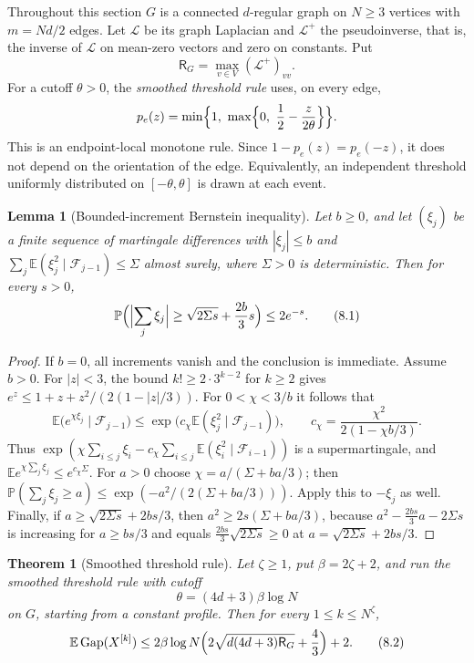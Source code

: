 \documentclass[11pt]{article}
\newtheorem{theorem}{Theorem}[section]
\newtheorem{lemma}[lemma]{Lemma}
\theoremstyle{remark}
\newcommand{\E}{\mathbb{E}}
\newcommand{\Pp}{\mathbb{P}}
\newcommand{\Gap}{\operatorname{Gap}}
\begin{document}
Throughout this section $G$ is a connected $d$-regular graph on $N\ge3$ vertices with $m=Nd/2$ edges. Let $\mathcal L$ be its graph Laplacian and $\mathcal L^+$ the pseudoinverse, that is, the inverse of $\mathcal L$ on mean-zero vectors and zero on constants. Put
\[
 \mathsf R_G=\max_{v\in V}(\mathcal L^+)_{vv}.
\]
For a cutoff $\theta>0$, the \emph{smoothed threshold rule} uses, on every edge,
\[
 p_e(z)=\min\Bigl\{1,\ \max\Bigl\{0,\ \frac12-\frac z{2\theta}\Bigr\}\Bigr\}.
\]
This is an endpoint-local monotone rule. Since $1-p_e(z)=p_e(-z)$, it does not depend on the orientation of the edge. Equivalently, an independent threshold uniformly distributed on $[-\theta,\theta]$ is drawn at each event.

\begin{lemma}[Bounded-increment Bernstein inequality]\label{lem:bernstein}
Let $b\ge0$, and let $(\xi_j)$ be a finite sequence of martingale differences with $|\xi_j|\le b$ and $\sum_j\E(\xi_j^2\mid\mathcal F_{j-1})\le\Sigma$ almost surely, where $\Sigma>0$ is deterministic. Then for every $s>0$,
\[
 \Pp\Bigl(\Bigl|\sum_j\xi_j\Bigr|\ge\sqrt{2\Sigma s}+\frac{2b}3s\Bigr)\le2e^{-s}.
 \tag{8.1}\label{eq:bernstein}
\]
\end{lemma}

\begin{proof}
If $b=0$, all increments vanish and the conclusion is immediate. Assume $b>0$. For $|z|<3$, the bound $k!\ge2\cdot3^{k-2}$ for $k\ge2$ gives $e^z\le1+z+z^2/(2(1-|z|/3))$. For $0<\chi<3/b$ it follows that
\[
 \E\bigl(e^{\chi\xi_j}\mid\mathcal F_{j-1}\bigr)
 \le\exp\bigl(c_\chi\E(\xi_j^2\mid\mathcal F_{j-1})\bigr),
 \qquad c_\chi=\frac{\chi^2}{2(1-\chi b/3)}.
\]
Thus $\exp(\chi\sum_{i\le j}\xi_i-c_\chi\sum_{i\le j}\E(\xi_i^2\mid\mathcal F_{i-1}))$ is a supermartingale, and $\E e^{\chi\sum_j\xi_j}\le e^{c_\chi\Sigma}$. For $a>0$ choose $\chi=a/(\Sigma+ba/3)$; then $\Pp(\sum_j\xi_j\ge a)\le\exp(-a^2/(2(\Sigma+ba/3)))$. Apply this to $-\xi_j$ as well. Finally, if $a\ge\sqrt{2\Sigma s}+2bs/3$, then $a^2\ge2s(\Sigma+ba/3)$, because $a^2-\frac{2bs}3a-2\Sigma s$ is increasing for $a\ge bs/3$ and equals $\frac{2bs}3\sqrt{2\Sigma s}\ge0$ at $a=\sqrt{2\Sigma s}+2bs/3$.
\end{proof}

\begin{theorem}[Smoothed threshold rule]\label{thm:smoothed}
Let $\zeta\ge1$, put $\beta=2\zeta+2$, and run the smoothed threshold rule with cutoff
\[
 \theta=(4d+3)\beta\log N
\]
on $G$, starting from a constant profile. Then for every $1\le k\le N^\zeta$,
\[
 \E\Gap(X^{[k]})
 \le 2\beta\log N\Bigl(2\sqrt{d(4d+3)\mathsf R_G}+\frac43\Bigr)+2.
 \tag{8.2}\label{eq:smoothed-bound}
\]
\end{theorem}
\end{document}
